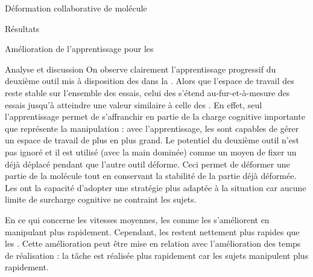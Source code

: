 \documentclass[myfrancais,ngerman,english,frenchb]{mythesis}
\begin{document}
\begin{mychapter}{Déformation collaborative de molécule}
\begin{mysection}{Résultats}
\begin{mysubsection}{Amélioration de l'apprentissage pour les }
\begin{mysubsubsection}{Analyse et discussion}
					On observe clairement l'apprentissage progressif du deuxième outil mis à disposition des  dans la .
					Alors que l'espace de travail des  reste stable sur l'ensemble des essais, celui des  s'étend au-fur-et-à-mesure des essais jusqu'à atteindre une valeur similaire à celle des .
					En effet, seul l'apprentissage permet de s'affranchir en partie de la charge cognitive importante que représente la manipulation   : avec l'apprentissage, les  sont capables de gérer un espace de travail de plus en plus grand.
					Le potentiel du deuxième outil n'est pas ignoré et il est utilisé (avec la main dominée) comme un moyen de fixer un  déjà déplacé pendant que l'autre outil déforme.
					Ceci permet de déformer une partie de la molécule tout en conservant la stabilité de la partie déjà déformée.
					Les  ont la capacité d'adopter une stratégie plus adaptée à la situation car aucune limite de surcharge cognitive ne contraint les sujets.

					En ce qui concerne les vitesses moyennes, les  comme les  s'améliorent en manipulant plus rapidement.
					Cependant, les  restent nettement plus rapides que les .
					Cette amélioration peut être mise en relation avec l'amélioration des temps de réalisation : la tâche est réalisée plus rapidement car les sujets manipulent plus rapidement.


\end{mysubsubsection}
\end{mysubsection}
\end{mysection}
\end{mychapter}
\end{document}
